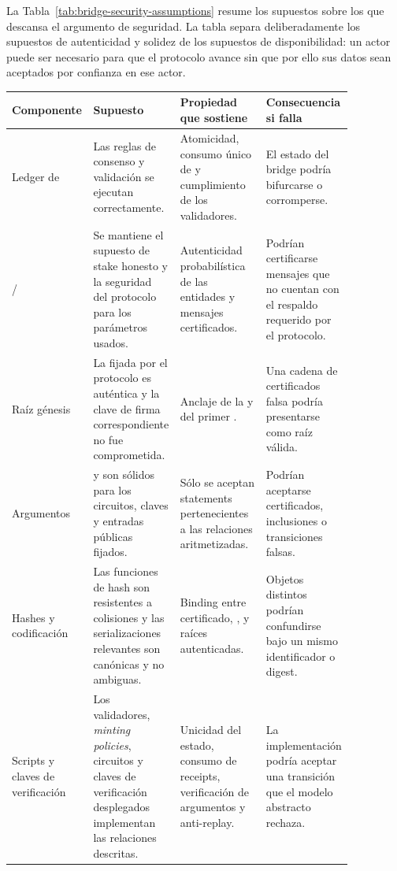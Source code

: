 La Tabla~\ref{tab:bridge-security-assumptions} resume los supuestos sobre los que descansa el argumento de seguridad. La tabla separa deliberadamente los supuestos de autenticidad y solidez de los supuestos de disponibilidad: un actor \Offchain puede ser necesario para que el protocolo avance sin que por ello sus datos sean aceptados por confianza en ese actor.

\begin{table}[H]
	\centering
	\scriptsize
	\setlength{\tabcolsep}{3pt}
	\begin{tabular}{p{0.15\linewidth} p{0.24\linewidth} p{0.25\linewidth} p{0.22\linewidth}}
		\toprule
		\textbf{Componente} & \textbf{Supuesto} & \textbf{Propiedad que sostiene} & \textbf{Consecuencia si falla} \\
		\midrule
		Ledger de \Cardano & Las reglas de consenso y validación \eUTxO se ejecutan correctamente. & Atomicidad, consumo único de \UTxOs y cumplimiento de los validadores. & El estado \Onchain del bridge podría bifurcarse o corromperse. \\
		\Mithril/\STM & Se mantiene el supuesto de stake honesto y la seguridad del protocolo \STM para los parámetros usados. & Autenticidad probabilística de las entidades y mensajes certificados. & Podrían certificarse mensajes que no cuentan con el respaldo requerido por el protocolo. \\
		Raíz génesis & La \GenesisVerificationKey fijada por el protocolo es auténtica y la clave de firma correspondiente no fue comprometida. & Anclaje de la \CertificateChain y del primer \StakeDistributionUTxO. & Una cadena de certificados falsa podría presentarse como raíz válida. \\
		Argumentos \ZK & \HaloTwo y \Groth son sólidos para los circuitos, claves y entradas públicas fijados. & Sólo se aceptan statements pertenecientes a las relaciones aritmetizadas. & Podrían aceptarse certificados, inclusiones o transiciones \SMT falsas. \\
		Hashes y codificación & Las funciones de hash son resistentes a colisiones y las serializaciones relevantes son canónicas y no ambiguas. & Binding entre certificado, \ProofReceipt, \TxId y raíces autenticadas. & Objetos distintos podrían confundirse bajo un mismo identificador o digest. \\
		Scripts y claves de verificación & Los validadores, \textit{minting policies}, circuitos y claves de verificación desplegados implementan las relaciones descritas. & Unicidad del estado, consumo de receipts, verificación de argumentos y anti-replay. & La implementación podría aceptar una transición que el modelo abstracto rechaza. \\

\end{tabular}
\end{table}
